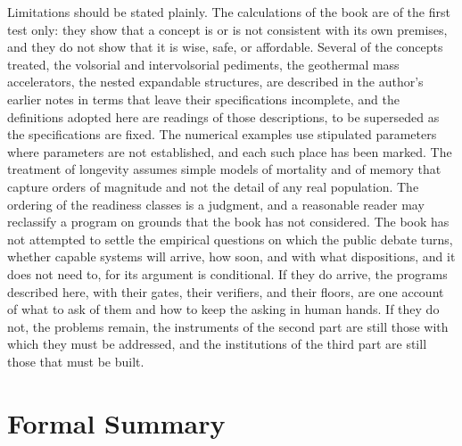 Limitations should be stated plainly. The calculations of the book are of the first test only: they show that a concept is or is not consistent with its own premises, and they do not show that it is wise, safe, or affordable. Several of the concepts treated, the volsorial and intervolsorial pediments, the geothermal mass accelerators, the nested expandable structures, are described in the author's earlier notes in terms that leave their specifications incomplete, and the definitions adopted here are readings of those descriptions, to be superseded as the specifications are fixed. The numerical examples use stipulated parameters where parameters are not established, and each such place has been marked. The treatment of longevity assumes simple models of mortality and of memory that capture orders of magnitude and not the detail of any real population. The ordering of the readiness classes is a judgment, and a reasonable reader may reclassify a program on grounds that the book has not considered. The book has not attempted to settle the empirical questions on which the public debate turns, whether capable systems will arrive, how soon, and with what dispositions, and it does not need to, for its argument is conditional. If they do arrive, the programs described here, with their gates, their verifiers, and their floors, are one account of what to ask of them and how to keep the asking in human hands. If they do not, the problems remain, the instruments of the second part are still those with which they must be addressed, and the institutions of the third part are still those that must be built.

\section*{Formal Summary}


